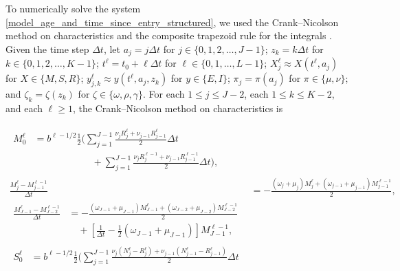 \documentclass{jpmarticle}
\let\subequationsorig\subequations%
\let\endsubequationsorig\endsubequations%
\renewenvironment{subequations}{
  \subequationsorig
  \renewcommand{\theequation}{\theparentequation.\arabic{equation}}
}{
  \endsubequationsorig
}
\begin{document}
To numerically solve the system
\eqref{model_age_and_time_since_entry_structured}, we used the
Crank--Nicolson method on characteristics and the composite trapezoid
rule for the integrals \autocite{milner_1992}.  Given the time step
$\Delta t$, let $a_j = j \Delta t$ for
$j \in \{0, 1, 2, \ldots, J - 1\}$;
$z_k = k \Delta t$
for $k \in \{0, 1, 2, \ldots, K - 1\}$;
$t^{\ell} = t_0 + \ell \Delta t$ for
$\ell \in \{0, 1, \ldots, L - 1\}$;
$X_j^{\ell} \approx X(t^{\ell}, a_j)$
for $X \in \{M, S, R\}$;
$y_{j, k}^{\ell} \approx y(t^{\ell}, a_j, z_k)$
for $y \in \{E, I\}$;
$\pi_j = \pi(a_j)$ for $\pi \in \{\mu, \nu\}$; and
$\zeta_k = \zeta(z_k)$ for $\zeta \in \{\omega, \rho, \gamma\}$.
For each $1 \leq j \leq J - 2$, each $1 \leq k \leq K - 2$, and each
$\ell \geq 1$, the Crank--Nicolson method on characteristics is
\begin{subequations}
  \begin{align}
    \begin{split}
      M_0^{\ell}
      &=
      b^{\ell - 1 / 2}
      \frac{1}{2}
      \Bigg(
      \sum_{j = 1}^{J - 1}
      \frac{\nu_j R_j^{\ell} + \nu_{j - 1} R_{j - 1}^{\ell}}{2}
      \Delta t
      \\ & \quad\quad\quad\quad\quad\quad {}
      + \sum_{j = 1}^{J - 1}
      \frac{\nu_j R_j^{\ell - 1} + \nu_{j - 1} R_{j - 1}^{\ell - 1}}{2}
      \Delta t
      \Bigg),
    \end{split}
    \\
    \frac{M_j^{\ell} - M_{j - 1}^{\ell - 1}}{\Delta t}
    &=
    - \frac{(\omega_j + \mu_j) M_j^{\ell}
      + (\omega_{j - 1} + \mu_{j - 1}) M_{j - 1}^{\ell - 1}}
    {2},
    \\
    \begin{split}
      \frac{M_{J - 1}^{\ell} - M_{J - 2}^{\ell - 1}}{\Delta t}
      &=
      - \frac{(\omega_{J - 1} + \mu_{J - 1}) M_{J - 1}^{\ell}
        + (\omega_{J - 2} + \mu_{J - 2}) M_{J - 2}^{\ell - 1}}
      {2}
      \\ & \quad {}
      +  \left[\frac{1}{\Delta t}
        - \frac{1}{2} (\omega_{J - 1} + \mu_{J - 1})\right]
      M_{J - 1}^{\ell - 1},
    \end{split}
    \\
    \begin{split}
      S_0^{\ell}
      &=
      b^{\ell - 1 / 2}
      \frac{1}{2}
      \Bigg(
      \sum_{j = 1}^{J - 1}
      \frac{\nu_j (N_j^{\ell} - R_j^{\ell})
        + \nu_{j - 1} (N_{j - 1}^{\ell} - R_{j - 1}^{\ell})}
      {2}
      \Delta t
      \\ & \quad\quad\quad\quad\quad\quad {}

\end{split}
\end{align}
\end{subequations}
\end{document}
